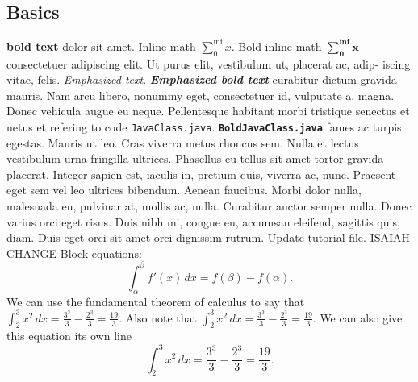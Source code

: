 \documentclass[12pt, dvipsnames, a4paper]{article}
\newcommand{\code}[1]{\texttt{#1}}
\begin{document}
\subsection{Basics}
\textbf{bold text} dolor sit amet. Inline math $\sum_{0}^{\inf} x$. Bold inline math $\mathbf{\sum_{0}^{\inf} x}$ consectetuer adipiscing elit. Ut purus elit, vestibulum ut, placerat ac, adip-
iscing vitae, felis. \emph{Emphasized text}. \textbf{\emph{Emphasized bold text}} curabitur dictum gravida mauris. Nam arcu libero, nonummy eget, consectetuer id,
vulputate a, magna. Donec vehicula augue eu neque. Pellentesque habitant morbi tristique senectus et
netus et refering to code \code{JavaClass.java}. \textbf{\code{BoldJavaClass.java}} fames ac turpis egestas. Mauris ut leo. Cras viverra metus rhoncus sem. Nulla et lectus
vestibulum urna fringilla ultrices. Phasellus eu tellus sit amet tortor gravida placerat. Integer sapien est,
iaculis in, pretium quis, viverra ac, nunc. Praesent eget sem vel leo ultrices bibendum. Aenean faucibus.
Morbi dolor nulla, malesuada eu, pulvinar at, mollis ac, nulla. Curabitur auctor semper nulla. Donec
varius orci eget risus. Duis nibh mi, congue eu, accumsan eleifend, sagittis quis, diam. Duis eget orci sit
amet orci dignissim rutrum. Update tutorial file. ISAIAH CHANGE Block equations:
\begin{equation}
	\int_\alpha^\beta f'(x) \, dx=f(\beta)-f(\alpha).
\end{equation}
We can use the fundamental theorem of calculus to say that
$\int_2^3 x^2 \, dx=\frac{3^3}{3}-\frac{2^3}{3}=\frac{19}{3}$.
Also note that $\displaystyle \int_2^3 x^2 \, dx=\frac{3^3}{3}-\frac{2^3}{3}=\frac{19}{3}$.
We can also give this equation its own line
\[
	\int_2^3 x^2 \, dx=\frac{3^3}{3}-\frac{2^3}{3}=\frac{19}{3}.
\]
\end{document}
